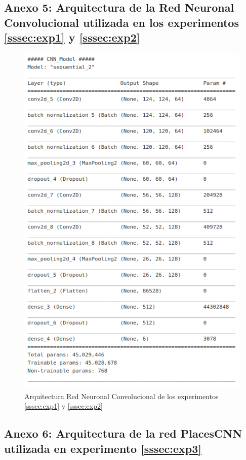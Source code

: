 \subsection{Anexo 5: Arquitectura de la Red Neuronal Convolucional utilizada en los experimentos \ref{sssec:exp1} y \ref{sssec:exp2}}\label{ssec:anexo5}

\begin{figure}[!htb]
	\centering
	\includegraphics[width=0.7\linewidth]{images/architecture_exp1_cnn}
	\caption{Arquitectura Red Neuronal Convolucional de los experimentos \ref{sssec:exp1} y \ref{sssec:exp2}}
	\label{fig:architectureexp2}
\end{figure}


\subsection{Anexo 6: Arquitectura de la red PlacesCNN utilizada en experimento \ref{sssec:exp3}}\label{ssec:anexo6}

